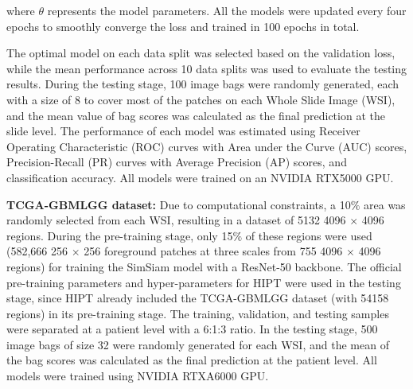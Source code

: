 \documentclass[times,twocolumn,final]{elsarticle}
\begin{document}
\noindent where $\theta$ represents the model parameters. All the models were updated every four epochs to smoothly converge the loss and trained in 100 epochs in total. 

The optimal model on each data split was selected based on the validation loss, while the mean performance across 10 data splits was used to evaluate the testing results. During the testing stage, 100 image bags were randomly generated, each with a size of 8 to cover most of the patches on each Whole Slide Image (WSI), and the mean value of bag scores was calculated as the final prediction at the slide level. The performance of each model was estimated using Receiver Operating Characteristic (ROC) curves with Area under the Curve (AUC) scores, Precision-Recall (PR) curves with Average Precision (AP) scores, and classification accuracy. All models were trained on an NVIDIA RTX5000 GPU.

\textbf{TCGA-GBMLGG dataset:} Due to computational constraints, a 10$\%$ area was randomly selected from each WSI, resulting in a dataset of 5132 4096 $\times$ 4096 regions. During the pre-training stage, only 15$\%$ of these regions were used (582,666 256 $\times$ 256 foreground patches at three scales from 755 4096 $\times$ 4096 regions) for training the SimSiam model with a ResNet-50 backbone. The official pre-training parameters and hyper-parameters for HIPT were used in the testing stage, since HIPT already included the TCGA-GBMLGG dataset (with 54158 regions) in its pre-training stage. The training, validation, and testing samples were separated at a patient level with a 6:1:3 ratio. In the testing stage, 500 image bags of size 32 were randomly generated for each WSI, and the mean of the bag scores was calculated as the final prediction at the patient level. All models were trained using NVIDIA RTXA6000 GPU.

\end{document}
